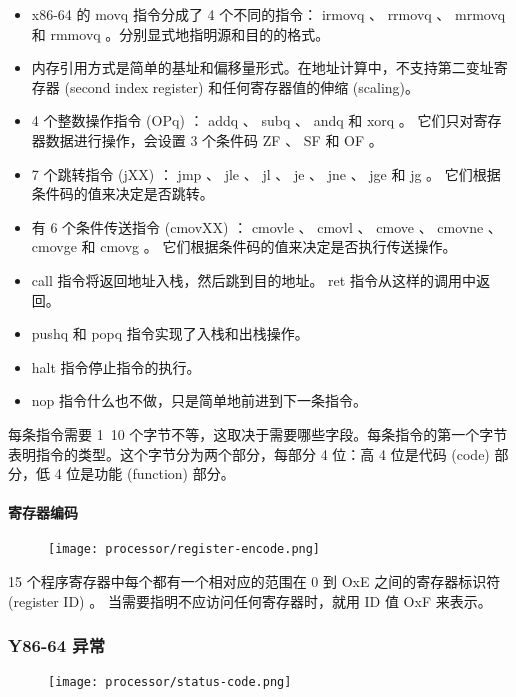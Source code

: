 \begin{itemize}
    \item x86-64 的 movq 指令分成了 4 个不同的指令： irmovq 、 rrmovq 、 mrmovq 和 rmmovq 。分别显式地指明源和目的的格式。
    \item 内存引用方式是简单的基址和偏移量形式。在地址计算中，不支持第二变址寄存器 (second index register) 和任何寄存器值的伸缩 (scaling)。
    \item 4 个整数操作指令 (OPq) ： addq 、 subq 、 andq 和 xorq 。 它们只对寄存器数据进行操作，会设置 3 个条件码 ZF 、 SF 和 OF 。
    \item 7 个跳转指令 (jXX) ： jmp 、 jle 、 jl 、 je 、 jne 、 jge 和 jg 。 它们根据条件码的值来决定是否跳转。
    \item 有 6 个条件传送指令 (cmovXX) ： cmovle 、 cmovl 、 cmove 、 cmovne 、 cmovge 和 cmovg 。 它们根据条件码的值来决定是否执行传送操作。
    \item call 指令将返回地址入栈，然后跳到目的地址。 ret 指令从这样的调用中返回。
    \item pushq 和 popq 指令实现了入栈和出栈操作。
    \item halt 指令停止指令的执行。
    \item nop 指令什么也不做，只是简单地前进到下一条指令。
\end{itemize}

每条指令需要 1~10 个字节不等，这取决于需要哪些字段。每条指令的第一个字节表明指令的类型。这个字节分为两个部分，每部分 4 位：高 4 位是代码 (code) 部分，低 4 位是功能 (function) 部分。

\paragraph{寄存器编码}
\begin{figure}[H]
    \centering
    \texttt{[image: processor/register-encode.png]}
\end{figure}

15 个程序寄存器中每个都有一个相对应的范围在 0 到 OxE 之间的寄存器标识符 (register ID) 。 当需要指明不应访问任何寄存器时，就用 ID 值 OxF 来表示。

\subsubsection{Y86-64 异常}

\begin{figure}[H]
    \centering
    \texttt{[image: processor/status-code.png]}
\end{figure}

